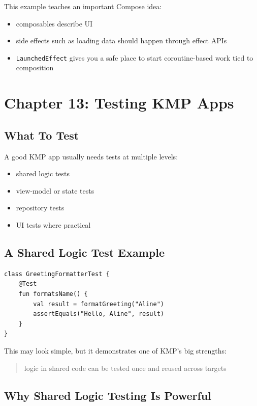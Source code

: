 \documentclass[11pt,a4paper]{article}
\begin{document}
This example teaches an important Compose idea:
\begin{itemize}
    \item composables describe UI
    \item side effects such as loading data should happen through effect APIs
    \item \texttt{LaunchedEffect} gives you a safe place to start coroutine-based work tied to composition
\end{itemize}

\section{Chapter 13: Testing KMP Apps}

\subsection{What To Test}

A good KMP app usually needs tests at multiple levels:
\begin{itemize}
    \item shared logic tests
    \item view-model or state tests
    \item repository tests
    \item UI tests where practical
\end{itemize}

\subsection{A Shared Logic Test Example}

\begin{lstlisting}[style=kazekotlin]
class GreetingFormatterTest {
    @Test
    fun formatsName() {
        val result = formatGreeting("Aline")
        assertEquals("Hello, Aline", result)
    }
}
\end{lstlisting}

This may look simple, but it demonstrates one of KMP's big strengths:
\begin{quote}
logic in shared code can be tested once and reused across targets
\end{quote}

\subsection{Why Shared Logic Testing Is Powerful}
\end{document}
